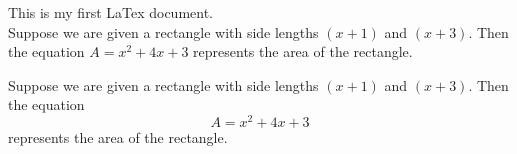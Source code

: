\documentclass[12pt]{article}
\begin{document}
This is my first LaTex document.\\

Suppose we are given a rectangle with side lengths $(x+1)$ and $(x+3)$. Then the equation $A=x^2+4x+3$ represents the area of the rectangle.

Suppose we are given a rectangle with side lengths $(x+1)$ and $(x+3)$. Then the equation $$A=x^2+4x+3$$ represents the area of the rectangle.
\end{document}
